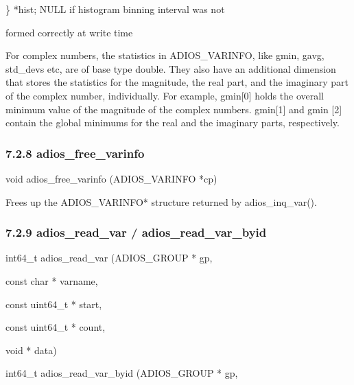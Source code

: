 \vspace{10pt}
\leftskip=166pt
\parindent=-144pt
\} *hist;   NULL if histogram binning interval was not 

\vspace{10pt}
formed correctly at write time

\vspace{10pt}
\leftskip=0pt
\parindent=0pt
For complex numbers, the statistics in ADIOS\_VARINFO, like gmin, gavg, std\_devs 
etc, are of base type double. They also have an additional dimension that stores 
the statistics for the magnitude, the real part, and the imaginary part of the 
complex number, individually. For example, gmin[0] holds the overall minimum value 
of the magnitude of the complex numbers. gmin[1] and gmin [2] contain the global 
minimums for the real and the imaginary parts, respectively. \label{HToc182553406}

\vspace{10pt}
\subsubsection*{{\large \textbf{7.2.8 adios\_free\_varinfo}}}

\vspace{10pt}
void adios\_free\_varinfo (ADIOS\_VARINFO *cp)

\vspace{22pt}
Frees up the ADIOS\_VARINFO* structure returned by adios\_inq\_var().\label{HToc182553407}

\vspace{10pt}
\subsubsection*{{\large \textbf{7.2.9 adios\_read\_var / adios\_read\_var\_byid}}}

\vspace{10pt}
int64\_t adios\_read\_var (ADIOS\_GROUP    * gp, 

\vspace{10pt}
\parindent=86pt
const char     * varname,

\vspace{10pt}
const uint64\_t * start,

\vspace{10pt}
\parindent=172pt
const uint64\_t * count,

\vspace{10pt}
\parindent=86pt
void           * data)

\vspace{22pt}
\parindent=0pt
int64\_t adios\_read\_var\_byid (ADIOS\_GROUP * gp, 

